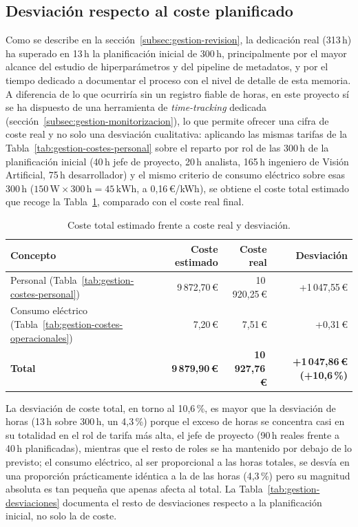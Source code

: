 \subsection{Desviación respecto al coste planificado}

Como se describe en la sección~\ref{subsec:gestion-revision}, la dedicación
real (313\,h) ha superado en 13\,h la planificación inicial de 300\,h,
principalmente por el mayor alcance del estudio de hiperparámetros y del
pipeline de metadatos, y por el tiempo dedicado a documentar el proceso
con el nivel de detalle de esta memoria. A diferencia de lo que ocurriría
sin un registro fiable de horas, en este proyecto sí se ha dispuesto de
una herramienta de \emph{time-tracking} dedicada
(sección~\ref{subsec:gestion-monitorizacion}), lo que permite ofrecer una
cifra de coste real y no solo una desviación cualitativa: aplicando las
mismas tarifas de la Tabla~\ref{tab:gestion-costes-personal} sobre el
reparto por rol de las 300\,h de la planificación inicial (40\,h jefe de
proyecto, 20\,h analista, 165\,h ingeniero de Visión Artificial, 75\,h
desarrollador) y el mismo criterio de consumo eléctrico sobre esas 300\,h
($150\,\mathrm{W} \times 300\,\mathrm{h} = 45\,\mathrm{kWh}$, a
0{,}16\,€/kWh), se obtiene el coste total estimado que recoge la
Tabla~\ref{tab:gestion-costes-resumen}, comparado con el coste real
final.

\begin{table}[htp]
\centering
\caption{Coste total estimado frente a coste real y desviación.}
\label{tab:gestion-costes-resumen}
\renewcommand{\arraystretch}{1.3}
\begin{tabular}{|p{3.6cm}|r|r|r|}
\hline
\rowcolor{gray!25}
\textbf{Concepto} & \textbf{Coste estimado} & \textbf{Coste real} & \textbf{Desviación} \\
\hline
Personal (Tabla~\ref{tab:gestion-costes-personal}) & 9\,872{,}70\,€ &
  10\,920{,}25\,€ & +1\,047{,}55\,€ \\
\hline
Consumo eléctrico (Tabla~\ref{tab:gestion-costes-operacionales}) &
  7{,}20\,€ & 7{,}51\,€ & +0{,}31\,€ \\
\hline
\rowcolor{gray!10}
\textbf{Total} & \textbf{9\,879{,}90\,€} & \textbf{10\,927{,}76\,€} &
  \textbf{+1\,047{,}86\,€ (+10{,}6\,\%)} \\
\hline
\end{tabular}
\end{table}

La desviación de coste total, en torno al 10{,}6\,\%, es mayor que la
desviación de horas (13\,h sobre 300\,h, un 4{,}3\,\%) porque el exceso
de horas se concentra casi en su totalidad en el rol de tarifa más alta,
el jefe de proyecto (90\,h reales frente a 40\,h planificadas), mientras
que el resto de roles se ha mantenido por debajo de lo previsto; el
consumo eléctrico, al ser proporcional a las horas totales, se desvía en
una proporción prácticamente idéntica a la de las horas (4{,}3\,\%) pero
su magnitud absoluta es tan pequeña que apenas afecta al total. La
Tabla~\ref{tab:gestion-desviaciones} documenta
el resto de desviaciones respecto a la planificación inicial, no solo la
de coste.


